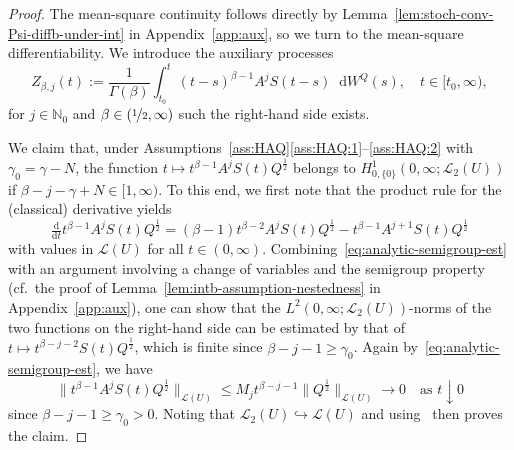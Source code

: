 \documentclass[reqno]{amsart}
\numberwithin{equation}{section}
\newcommand{\N}{\mathbb{N}}
\newcommand{\norm}[2]{     \| #1       \|_{ #2 }}
\newcommand{\rd}{\mathop{}\!\mathrm{d}}
\newcommand{\LO}{\mathscr L}
\theoremstyle{remark}
\theoremstyle{definition}
\begin{document}
\begin{proof}
	The mean-square continuity follows directly
	by Lemma~\ref{lem:stoch-conv-Psi-diffb-under-int} in Appendix~\ref{app:aux},
	so we turn to the mean-square differentiability.
	We introduce the
	auxiliary processes
	\[
	Z_{\beta,j}(t) 
	:= 
	\frac{1}{\Gamma(\beta)}\int_{t_0}^t (t-s)^{\beta-1} A^j S(t-s)\rd W^Q(s),
	\quad
	t \in [t_0,\infty),
	\]
	for $j \in \N_0$ and $\beta \in (\nicefrac{1}{2}, \infty)$
	such the right-hand side exists.
	
	We claim
	that, under Assumptions~\textup{\ref{ass:HAQ}\ref{ass:HAQ:1}--\ref{ass:HAQ:2}}
	with
	$\gamma_0 = \gamma - N$,
	the function
	${t \mapsto t^{\beta - 1} A^j S(t)Q^\frac{1}{2}}$
	belongs to 
	$H^1_{0,\{0\}}(0, \infty; \mathscr L_2(U))$
	if
	$\beta - j - \gamma + N \in [1,\infty)$.
	To this end, we first note that the product rule for the (classical) derivative yields
	\[
	\tfrac{\mathrm d}{\mathrm dt}t^{\beta - 1} A^j S(t)Q^\frac{1}{2}
	=
	(\beta - 1) t^{\beta-2} A^j S(t)Q^\frac{1}{2}
	-
	t^{\beta - 1} A^{j+1} S(t)Q^\frac{1}{2}
	\]
	with values in $\LO(U)$ for all $t \in (0,\infty)$.
	Combining~\eqref{eq:analytic-semigroup-est} with an argument involving a change of variables and the semigroup property
	(cf.~the proof of Lemma~\ref{lem:intb-assumption-nestedness} in Appendix~\ref{app:aux}),
	one can show that the $L^2(0,\infty; \mathscr L_2(U))$-norms of
	the two functions on the right-hand side
	can be estimated by that of $t \mapsto t^{\beta-j-2}S(t)Q^\frac{1}{2}$,
	which is finite since $\beta - j - 1 \ge \gamma_0$.
	Again by~\eqref{eq:analytic-semigroup-est}, we have
	\[
	\norm{t^{\beta - 1} A^j S(t)Q^\frac{1}{2}}{\LO(U)} \le M_j t^{\beta - j - 1} \norm{Q^\frac{1}{2}}{\LO(U)} \to 0
	\quad 
	\text{as } t \downarrow 0
	\]
	since $\beta - j - 1 \ge \gamma_0>0$. Noting that $\LO_2(U) \hookrightarrow \LO(U)$ 
	and using~\cite[Lemma~A.9]{KW2022} then proves the claim.
	

\end{proof}
\end{document}
